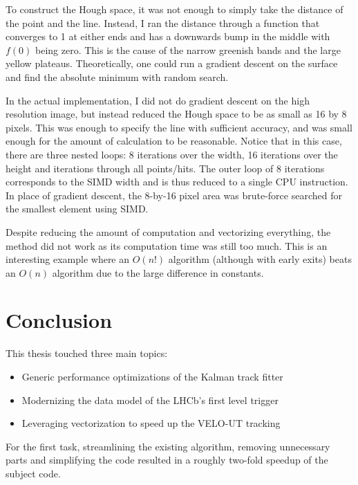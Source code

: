 \documentclass[12pt]{article}
\begin{document}
To construct the Hough space, it was not enough to simply take the distance of the point and the line. Instead, I ran the distance through a function that converges to 1 at either ends and has a downwards bump in the middle with $f(0)$ being zero. This is the cause of the narrow greenish bands and the large yellow plateaus. Theoretically, one could run a gradient descent on the surface and find the absolute minimum with random search.
\vspace{1pc}

In the actual implementation, I did not do gradient descent on the high resolution image, but instead reduced the Hough space to be as small as 16 by 8 pixels. This was enough to specify the line with sufficient accuracy, and was small enough for the amount of calculation to be reasonable. Notice that in this case, there are three nested loops: 8 iterations over the width, 16 iterations over the height and iterations through all points/hits. The outer loop of 8 iterations corresponds to the SIMD width and is thus reduced to a single CPU instruction. In place of gradient descent, the 8-by-16 pixel area was brute-force searched for the smallest element using SIMD.
\vspace{1pc}

Despite reducing the amount of computation and vectorizing everything, the method did not work as its computation time was still too much. This is an interesting example where an $O(n!)$ algorithm (although with early exits) beats an $O(n)$ algorithm due to the large difference in constants.


\newpage
\section{Conclusion}

This thesis touched three main topics:
\begin{itemize}
	\item Generic performance optimizations of the Kalman track fitter
	\item Modernizing the data model of the LHCb's first level trigger
	\item Leveraging vectorization to speed up the VELO-UT tracking
\end{itemize}
For the first task, streamlining the existing algorithm, removing unnecessary parts and simplifying the code resulted in a roughly two-fold speedup of the subject code.
\end{document}
